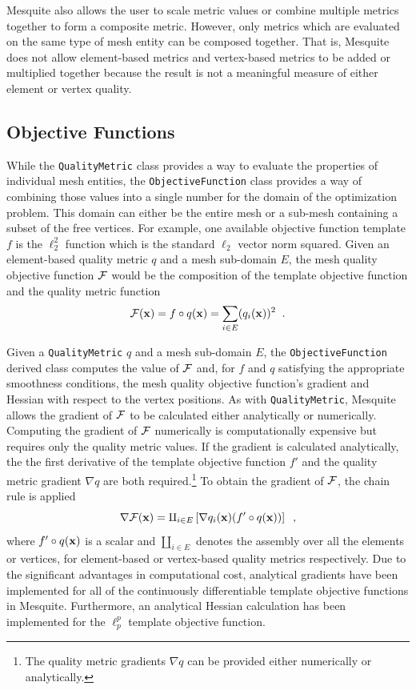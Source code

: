 \documentclass[psfig]{article}
\begin{document}
Mesquite also allows the user to scale metric values or combine
multiple metrics together to form a composite metric.  However, only
metrics which are evaluated on the same type of mesh entity can be
composed together.  That is, Mesquite does not allow element-based
metrics and vertex-based metrics to be added or multiplied together
because the result is not a meaningful measure of either element or
vertex quality.

\subsection{Objective Functions}
\label{objective_section}

While the \texttt{QualityMetric} class provides a way to evaluate the
properties of individual mesh entities, the \texttt{ObjectiveFunction}
class provides a way of combining those values into a single number
for the domain of the optimization problem.  This domain can either be
the entire mesh or a sub-mesh containing a subset of the free vertices.
For example, one available objective function template $f$ is the $\ell_{2}^2$
function which is the standard $\ell_{2}$ vector norm squared.  
Given an element-based quality metric $q$ and a mesh sub-domain $E$, the mesh 
quality objective function $\cal F$ would be the composition of the template
objective function and the quality metric function 
\begin{equation}
{\cal F}({\bf x}) = f \circ q({\bf x}) = \sum_{i \in E} (q_i({\bf x}))^2 \;\; .
\end{equation}

Given a \texttt{QualityMetric} $q$ and a mesh sub-domain $E$, the
\texttt{ObjectiveFunction} derived class computes the value of $\cal
F$ and, for $f$ and $q$ satisfying the appropriate smoothness
conditions, the mesh quality objective function's gradient and Hessian
with respect to the vertex positions.  As with {\tt QualityMetric},
Mesquite allows the gradient of $\cal F$ to be calculated either
analytically or numerically. Computing the gradient of $\cal F$
numerically is computationally expensive but requires only the quality
metric values.  If the gradient is calculated analytically, the the
first derivative of the template objective function $f'$ and the
quality metric gradient $\nabla q$ are both required.\footnote{The 
quality metric gradients $\nabla q$ can be provided either numerically 
or analytically.}
To obtain the gradient of ${\cal F}$, the chain rule is applied
\begin{equation}
\nabla {\cal F}({\bf x}) = \amalg_{i \in E} \left[ \nabla q_i({\bf x}) 
 (f' \circ q({\bf x}) ) \right] \;\; ,
\end{equation}
where $ f' \circ q({\bf x})$ is a scalar and $\amalg_{i \in E}$ denotes the
assembly over all the elements or vertices, for element-based or 
vertex-based quality metrics respectively.
Due to the significant advantages in computational
cost, analytical gradients have been implemented for all of the
continuously differentiable template objective functions in Mesquite.
Furthermore, an analytical Hessian calculation has been implemented
for the $\ell_p^p$ template objective function.  
\end{document}
